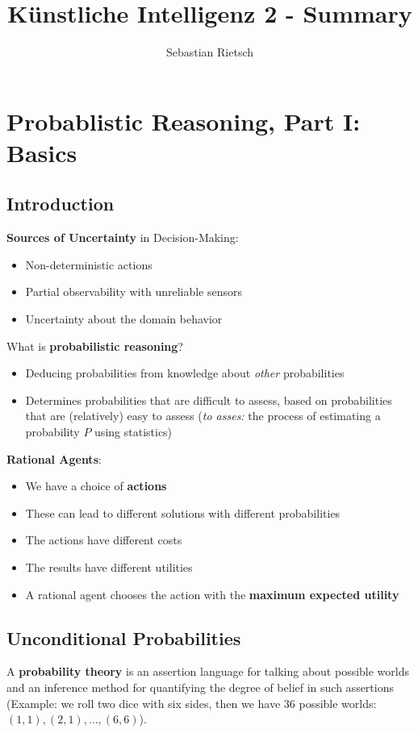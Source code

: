 \documentclass{scrartcl}
\title{Künstliche Intelligenz 2 - Summary}
\author{Sebastian Rietsch}
\begin{document}
\maketitle

\section{Probablistic Reasoning, Part I: Basics}
\subsection{Introduction}
\textbf{Sources of Uncertainty} in Decision-Making:
\begin{itemize}
    \item
        Non-deterministic actions
    \item
        Partial observability with unreliable sensors
    \item
        Uncertainty about the domain behavior
\end{itemize}

What is \textbf{probabilistic reasoning}?
\begin{itemize}
    \item
        Deducing probabilities from knowledge about \textit{other} probabilities
    \item
        Determines probabilities that are difficult to assess, based on probabilities that are (relatively) easy to assess (\textit{to asses:} the process of estimating a probability \(P\) using statistics)
\end{itemize}

\textbf{Rational Agents}:
\begin{itemize}
    \item
        We have a choice of \textbf{actions}
    \item
        These can lead to different solutions with different probabilities
    \item
        The actions have different costs
    \item
        The results have different utilities
    \item
        A rational agent chooses the action with the \textbf{maximum expected utility}
\end{itemize}

\subsection{Unconditional Probabilities}
A \textbf{probability theory} is an assertion language for talking about possible worlds and an inference method for quantifying the degree of belief in such assertions (Example: we roll two dice with six sides, then we have 36 possible worlds: \((1,1), (2,1), \dots, (6,6)\)).
\end{document}
